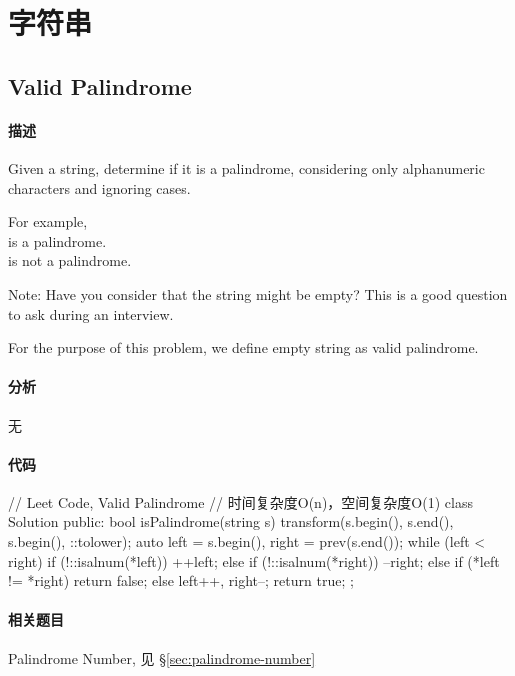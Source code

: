 \chapter{字符串}


\section{Valid Palindrome} %
\label{sec:valid-palindrome}


\subsubsection{描述}
Given a string, determine if it is a palindrome, considering only alphanumeric characters and ignoring cases.

For example,\\
 is a palindrome.\\
 is not a palindrome.

Note:
Have you consider that the string might be empty? This is a good question to ask during an interview.

For the purpose of this problem, we define empty string as valid palindrome.


\subsubsection{分析}
无


\subsubsection{代码}
\begin{Code}
// Leet Code, Valid Palindrome
// 时间复杂度O(n)，空间复杂度O(1)
class Solution {
public:
    bool isPalindrome(string s) {
        transform(s.begin(), s.end(), s.begin(), ::tolower);
        auto left = s.begin(), right = prev(s.end());
        while (left < right) {
            if (!::isalnum(*left))  ++left;
            else if (!::isalnum(*right)) --right;
            else if (*left != *right) return false;
            else{ left++, right--; }
        }
        return true;
    }
};
\end{Code}


\subsubsection{相关题目}
\begindot
\item Palindrome Number, 见 \S \ref{sec:palindrome-number}
\myenddot


